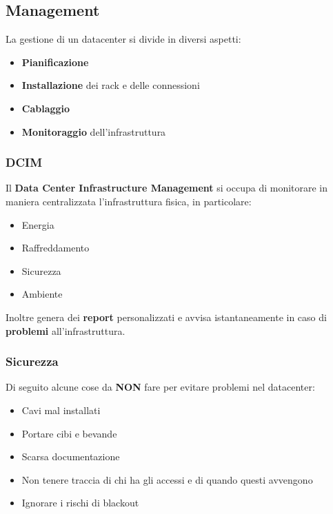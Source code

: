 \subsection{Management}
La gestione di un datacenter si divide in diversi aspetti:
\begin{itemize}
	\item \textbf{Pianificazione}
	\item \textbf{Installazione} dei rack e delle connessioni
	\item \textbf{Cablaggio}
	\item \textbf{Monitoraggio} dell'infrastruttura
\end{itemize}
\subsubsection{DCIM}
Il \textbf{Data Center Infrastructure Management} si occupa di monitorare in maniera centralizzata l'infrastruttura fisica, in particolare:
\begin{itemize}
	\item Energia
	\item Raffreddamento
	\item Sicurezza
	\item Ambiente
\end{itemize}
Inoltre genera dei \textbf{report} personalizzati e avvisa istantaneamente in caso di \textbf{problemi} all'infrastruttura.
\subsubsection{Sicurezza}
Di seguito alcune cose da \textbf{NON} fare per evitare problemi nel datacenter:
\begin{itemize}
	\item Cavi mal installati
	\item Portare cibi e bevande
	\item Scarsa documentazione
	\item Non tenere traccia di chi ha gli accessi e di quando questi avvengono
	\item Ignorare i rischi di blackout
\end{itemize}
